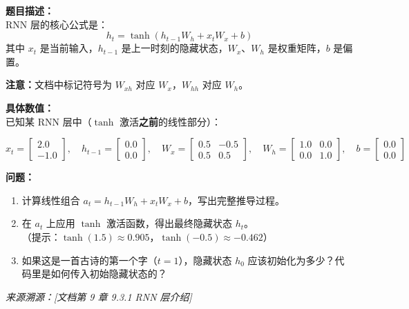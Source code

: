 \documentclass[a4paper,11pt]{ctexart}
\begin{document}
\begin{problembox}
    \textbf{题目描述：}\\
    RNN 层的核心公式是：
    \begin{equation}
        h_t = \tanh(h_{t-1} W_h + x_t W_x + b)
    \end{equation}
    其中 $x_t$ 是当前输入，$h_{t-1}$ 是上一时刻的隐藏状态，$W_x$、$W_h$ 是权重矩阵，$b$ 是偏置。

    \textbf{注意：}文档中标记符号为 $W_{xh}$ 对应 $W_x$，$W_{hh}$ 对应 $W_h$。

    \vspace{0.2cm}
    \textbf{具体数值：}\\
    已知某 RNN 层中（$\tanh$ 激活\textbf{之前}的线性部分）：

    \[
    x_t = \begin{bmatrix} 2.0 \\ -1.0 \end{bmatrix}, \quad
    h_{t-1} = \begin{bmatrix} 0.0 \\ 0.0 \end{bmatrix}, \quad
    W_x = \begin{bmatrix} 0.5 & -0.5 \\ 0.5 & 0.5 \end{bmatrix}, \quad
    W_h = \begin{bmatrix} 1.0 & 0.0 \\ 0.0 & 1.0 \end{bmatrix}, \quad
    b = \begin{bmatrix} 0.0 \\ 0.0 \end{bmatrix}
    \]

    \vspace{0.2cm}
    \textbf{问题：}
    \begin{enumerate}[(1)]
        \item 计算线性组合 $a_t = h_{t-1}W_h + x_t W_x + b$，写出完整推导过程。
        \item 在 $a_t$ 上应用 $\tanh$ 激活函数，得出最终隐藏状态 $h_t$。\\（提示：$\tanh(1.5) \approx 0.905$，$\tanh(-0.5) \approx -0.462$）
        \item 如果这是一首古诗的第一个字（$t=1$），隐藏状态 $h_0$ 应该初始化为多少？代码里是如何传入初始隐藏状态的？
    \end{enumerate}

    \vspace{0.2cm}
    {\color{gray}\small\textit{来源溯源：[文档第 9 章 9.3.1 RNN 层介绍]}}
\end{problembox}
\end{document}

